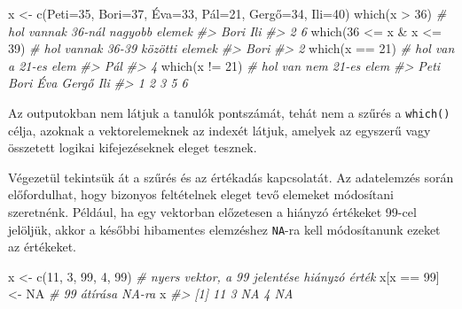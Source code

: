 \documentclass[
]{book}
\newenvironment{Shaded}{\begin{snugshade}}{\end{snugshade}}
\newcommand{\CommentTok}[1]{\textcolor[rgb]{0.56,0.35,0.01}{\textit{#1}}}
\newcommand{\ConstantTok}[1]{\textcolor[rgb]{0.00,0.00,0.00}{#1}}
\newcommand{\DecValTok}[1]{\textcolor[rgb]{0.00,0.00,0.81}{#1}}
\newcommand{\FunctionTok}[1]{\textcolor[rgb]{0.00,0.00,0.00}{#1}}
\newcommand{\NormalTok}[1]{#1}
\newcommand{\OtherTok}[1]{\textcolor[rgb]{0.56,0.35,0.01}{#1}}
\newcommand{\SpecialCharTok}[1]{\textcolor[rgb]{0.00,0.00,0.00}{#1}}
\newcommand{\StringTok}[1]{\textcolor[rgb]{0.31,0.60,0.02}{#1}}
\begin{document}
\begin{Shaded}
\begin{Highlighting}[]
\NormalTok{x }\OtherTok{\textless{}{-}} \FunctionTok{c}\NormalTok{(}\StringTok{\textquotesingle{}Peti\textquotesingle{}}\OtherTok{=}\DecValTok{35}\NormalTok{, }\StringTok{\textquotesingle{}Bori\textquotesingle{}}\OtherTok{=}\DecValTok{37}\NormalTok{, }\StringTok{\textquotesingle{}Éva\textquotesingle{}}\OtherTok{=}\DecValTok{33}\NormalTok{, }\StringTok{\textquotesingle{}Pál\textquotesingle{}}\OtherTok{=}\DecValTok{21}\NormalTok{, }\StringTok{\textquotesingle{}Gergő\textquotesingle{}}\OtherTok{=}\DecValTok{34}\NormalTok{, }\StringTok{\textquotesingle{}Ili\textquotesingle{}}\OtherTok{=}\DecValTok{40}\NormalTok{)}
\FunctionTok{which}\NormalTok{(x }\SpecialCharTok{\textgreater{}} \DecValTok{36}\NormalTok{)             }\CommentTok{\# hol vannak 36{-}nál nagyobb elemek}
\CommentTok{\#\textgreater{} Bori  Ili }
\CommentTok{\#\textgreater{}    2    6}
\FunctionTok{which}\NormalTok{(}\DecValTok{36} \SpecialCharTok{\textless{}=}\NormalTok{ x }\SpecialCharTok{\&}\NormalTok{ x }\SpecialCharTok{\textless{}=} \DecValTok{39}\NormalTok{)  }\CommentTok{\# hol vannak 36{-}39 közötti elemek}
\CommentTok{\#\textgreater{} Bori }
\CommentTok{\#\textgreater{}    2}
\FunctionTok{which}\NormalTok{(x }\SpecialCharTok{==} \DecValTok{21}\NormalTok{)            }\CommentTok{\# hol van a 21{-}es elem}
\CommentTok{\#\textgreater{} Pál }
\CommentTok{\#\textgreater{}   4}
\FunctionTok{which}\NormalTok{(x }\SpecialCharTok{!=} \DecValTok{21}\NormalTok{)            }\CommentTok{\# hol van nem 21{-}es elem}
\CommentTok{\#\textgreater{}  Peti  Bori   Éva Gergő   Ili }
\CommentTok{\#\textgreater{}     1     2     3     5     6}
\end{Highlighting}
\end{Shaded}

Az outputokban nem látjuk a tanulók pontszámát, tehát nem a szűrés a \texttt{which()} célja, azoknak a vektorelemeknek az indexét látjuk, amelyek az egyszerű vagy összetett logikai kifejezéseknek eleget tesznek.

Végezetül tekintsük át a szűrés és az értékadás kapcsolatát. Az adatelemzés során előfordulhat, hogy bizonyos feltételnek eleget tevő elemeket módosítani szeretnénk. Például, ha egy vektorban előzetesen a hiányzó értékeket 99-cel jelöljük, akkor a későbbi hibamentes elemzéshez \texttt{NA}-ra kell módosítanunk ezeket az értékeket.

\begin{Shaded}
\begin{Highlighting}[]
\NormalTok{x }\OtherTok{\textless{}{-}} \FunctionTok{c}\NormalTok{(}\DecValTok{11}\NormalTok{, }\DecValTok{3}\NormalTok{, }\DecValTok{99}\NormalTok{, }\DecValTok{4}\NormalTok{, }\DecValTok{99}\NormalTok{)   }\CommentTok{\# nyers vektor, a 99 jelentése hiányzó érték}
\NormalTok{x[x }\SpecialCharTok{==} \DecValTok{99}\NormalTok{] }\OtherTok{\textless{}{-}} \ConstantTok{NA}           \CommentTok{\# 99 átírása NA{-}ra}
\NormalTok{x}
\CommentTok{\#\textgreater{} [1] 11  3 NA  4 NA}
\end{Highlighting}
\end{Shaded}
\end{document}
